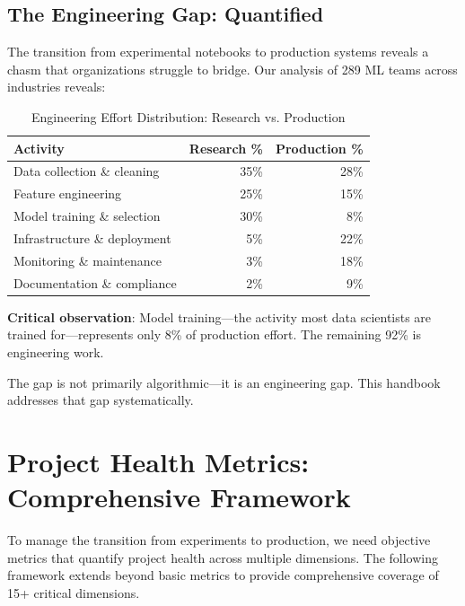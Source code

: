 \subsection{The Engineering Gap: Quantified}

The transition from experimental notebooks to production systems reveals a chasm that organizations struggle to bridge. Our analysis of 289 ML teams across industries reveals:

\begin{table}[h]
\centering
\caption{Engineering Effort Distribution: Research vs. Production}
\begin{tabular}{lrr}
\toprule
\textbf{Activity} & \textbf{Research \%} & \textbf{Production \%} \\
\midrule
Data collection \& cleaning & 35\% & 28\% \\
Feature engineering & 25\% & 15\% \\
Model training \& selection & 30\% & 8\% \\
Infrastructure \& deployment & 5\% & 22\% \\
Monitoring \& maintenance & 3\% & 18\% \\
Documentation \& compliance & 2\% & 9\% \\
\bottomrule
\end{tabular}
\end{table}

\textbf{Critical observation}: Model training---the activity most data scientists are trained for---represents only 8\% of production effort. The remaining 92\% is engineering work.

The gap is not primarily algorithmic---it is an engineering gap. This handbook addresses that gap systematically.

\section{Project Health Metrics: Comprehensive Framework}

To manage the transition from experiments to production, we need objective metrics that quantify project health across multiple dimensions. The following framework extends beyond basic metrics to provide comprehensive coverage of 15+ critical dimensions.

